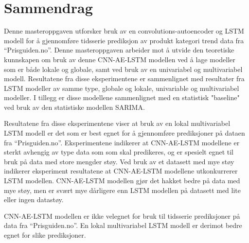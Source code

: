 \section*{Sammendrag}
\label{section:Sammendrag}


Denne masteroppgaven utforsker bruk av en convolutions-autoencoder og LSTM modell for å gjennomføre
tidsserie prediksjon av produkt kategori trend data fra ``Prisguiden.no''.
Denne masteroppgaven arbeider mot å utvide den teoretiske kunnskapen om bruk av denne CNN-AE-LSTM modellen
ved å lage modeller som er både lokale og globale, samt ved bruk av en univariabel og multivariabel modell.
Resultatene fra disse eksperimentene er sammenlignet med resultater fra LSTM modeller av samme type, globale og lokale, univariable og multivariabel modeller.
I tillegg er disse modellene sammenlignet med en statistisk "baseline" ved bruk av den statistiske modellen SARIMA.


Resultatene fra disse eksperimentene viser at bruk av en lokal multivariabel LSTM modell er det som er best egnet for å gjennomføre
prediksjoner på dataen fra ``Prisguiden.no''.
Eksperimentene indikerer at CNN-AE-LSTM modellene er sterkt avhengig av type data som som skal predikeres,
og er spesielt egnet til bruk på data med store mengder støy.
Ved bruk av et datasett med mye støy indikerer eksperiment resultatene at CNN-AE-LSTM modellene utkonkurrerer LSTM modellen.
CNN-AE-LSTM modellen gjør det hakket bedre på data med mye støy, men er svært mye dårligere enn LSTM modellen på datasett med lite eller ingen datastøy.


CNN-AE-LSTM modellen er ikke velegnet for bruk til tidsserie prediksjoner på data fra ``Prisguiden.no''.
En lokal multivariabel LSTM modell er derimot bedre egnet for slike prediksjoner.

